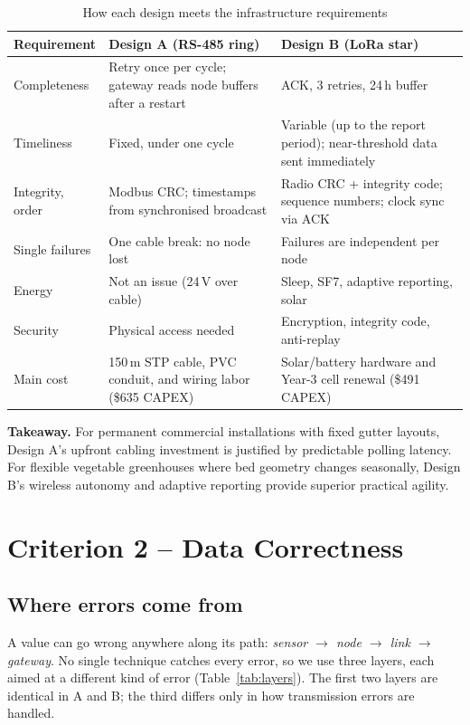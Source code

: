 \documentclass[11pt,a4paper]{report}
\begin{document}
\begin{table}[htbp]
\centering
\caption{How each design meets the infrastructure requirements}\label{tab:infra}
\small
\renewcommand{\arraystretch}{0.95}
\begin{tabularx}{\textwidth}{>{\raggedright\arraybackslash}p{2.8cm} Y Y}
\toprule
\textbf{Requirement} & \textbf{Design A (RS-485 ring)} & \textbf{Design B (LoRa star)}\\
\midrule
Completeness & Retry once per cycle; gateway reads node buffers after a restart & ACK, 3 retries, 24\,h buffer\\
Timeliness & Fixed, under one cycle & Variable (up to the report period); near-threshold data sent immediately\\
Integrity, order & Modbus CRC; timestamps from synchronised broadcast & Radio CRC + integrity code; sequence numbers; clock sync via ACK\\
Single failures & One cable break: no node lost & Failures are independent per node\\
Energy & Not an issue (24\,V over cable) & Sleep, SF7, adaptive reporting, solar\\
Security & Physical access needed & Encryption, integrity code, anti-replay\\
Main cost & 150\,m STP cable, PVC conduit, and wiring labor (\$635 CAPEX) & Solar/battery hardware and Year-3 cell renewal (\$491 CAPEX)\\
\bottomrule
\end{tabularx}
\end{table}

\textbf{Takeaway.} For permanent commercial installations with fixed gutter layouts, Design A's upfront cabling investment is justified by predictable polling latency. For flexible vegetable greenhouses where bed geometry changes seasonally, Design B's wireless autonomy and adaptive reporting provide superior practical agility.

\chapter{Criterion 2 -- Data Correctness}\label{ch:correct}

\section{Where errors come from}
A value can go wrong anywhere along its path: \emph{sensor $\to$ node $\to$ link $\to$ gateway}. No single technique catches every error, so we use three layers, each aimed at a different kind of error (Table~\ref{tab:layers}). The first two layers are identical in A and B; the third differs only in how transmission errors are handled.
\end{document}
